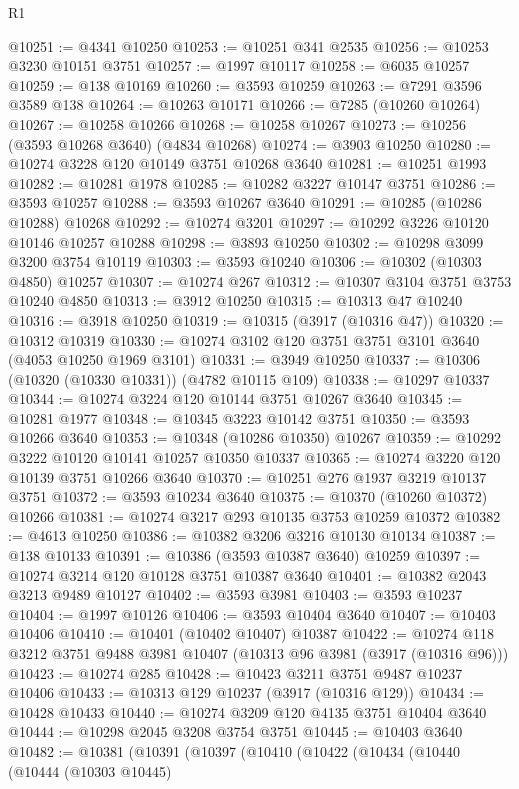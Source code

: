 \begin{lexlean}{R1}
\begin{coremodule}
@10251 := @4341 @10250
@10253 := @10251 @341 @2535
@10256 := @10253 @3230 @10151 @3751
@10257 := @1997 @10117
@10258 := @6035 @10257
@10259 := @138 @10169
@10260 := @3593 @10259
@10263 := @7291 @3596 @3589 @138
@10264 := @10263 @10171
@10266 := @7285 (@10260 @10264)
@10267 := @10258 @10266
@10268 := @10258 @10267
@10273 := @10256 (@3593 @10268 @3640) (@4834 @10268)
@10274 := @3903 @10250
@10280 := @10274 @3228 @120 @10149 @3751 @10268 @3640
@10281 := @10251 @1993
@10282 := @10281 @1978
@10285 := @10282 @3227 @10147 @3751
@10286 := @3593 @10257
@10288 := @3593 @10267 @3640
@10291 := @10285 (@10286 @10288) @10268
@10292 := @10274 @3201
@10297 := @10292 @3226 @10120 @10146 @10257 @10288
@10298 := @3893 @10250
@10302 := @10298 @3099 @3200 @3754 @10119
@10303 := @3593 @10240
@10306 := @10302 (@10303 @4850) @10257
@10307 := @10274 @267
@10312 := @10307 @3104 @3751 @3753 @10240 @4850
@10313 := @3912 @10250
@10315 := @10313 @47 @10240
@10316 := @3918 @10250
@10319 := @10315 (@3917 (@10316 @47))
@10320 := @10312 @10319
@10330 := @10274 @3102 @120 @3751 @3751 @3101 @3640 (@4053 @10250 @1969 @3101)
@10331 := @3949 @10250
@10337 := @10306 (@10320 (@10330 @10331)) (@4782 @10115 @109)
@10338 := @10297 @10337
@10344 := @10274 @3224 @120 @10144 @3751 @10267 @3640
@10345 := @10281 @1977
@10348 := @10345 @3223 @10142 @3751
@10350 := @3593 @10266 @3640
@10353 := @10348 (@10286 @10350) @10267
@10359 := @10292 @3222 @10120 @10141 @10257 @10350 @10337
@10365 := @10274 @3220 @120 @10139 @3751 @10266 @3640
@10370 := @10251 @276 @1937 @3219 @10137 @3751
@10372 := @3593 @10234 @3640
@10375 := @10370 (@10260 @10372) @10266
@10381 := @10274 @3217 @293 @10135 @3753 @10259 @10372
@10382 := @4613 @10250
@10386 := @10382 @3206 @3216 @10130 @10134
@10387 := @138 @10133
@10391 := @10386 (@3593 @10387 @3640) @10259
@10397 := @10274 @3214 @120 @10128 @3751 @10387 @3640
@10401 := @10382 @2043 @3213 @9489 @10127
@10402 := @3593 @3981
@10403 := @3593 @10237
@10404 := @1997 @10126
@10406 := @3593 @10404 @3640
@10407 := @10403 @10406
@10410 := @10401 (@10402 @10407) @10387
@10422 := @10274 @118 @3212 @3751 @9488 @3981 @10407 (@10313 @96 @3981 (@3917 (@10316 @96)))
@10423 := @10274 @285
@10428 := @10423 @3211 @3751 @9487 @10237 @10406
@10433 := @10313 @129 @10237 (@3917 (@10316 @129))
@10434 := @10428 @10433
@10440 := @10274 @3209 @120 @4135 @3751 @10404 @3640
@10444 := @10298 @2045 @3208 @3754 @3751
@10445 := @10403 @3640
@10482 := @10381
    (@10391
      (@10397
        (@10410
          (@10422
            (@10434
              (@10440
                (@10444
                  (@10303 @10445)

\end{coremodule}
\end{lexlean}
